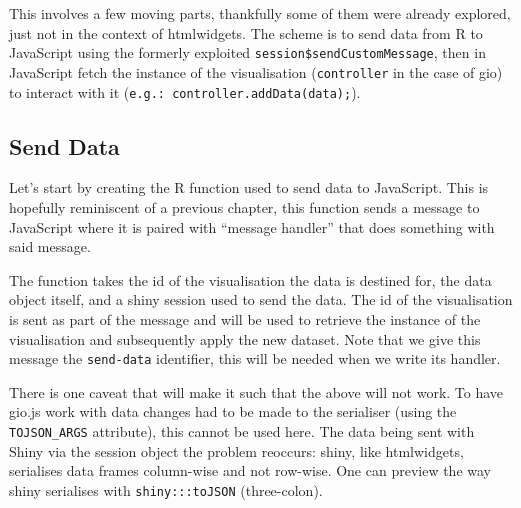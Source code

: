 \documentclass[
]{krantz}
\makeatletter
\newenvironment{Shaded}{\begin{snugshade}}{\end{snugshade}}
\newcommand{\CommentTok}[1]{\textcolor[rgb]{0.37,0.37,0.37}{\textit{#1}}}
\newcommand{\ControlFlowTok}[1]{\textcolor[rgb]{0.27,0.27,0.27}{\textbf{#1}}}
\newcommand{\DataTypeTok}[1]{\textcolor[rgb]{0.27,0.27,0.27}{#1}}
\newcommand{\KeywordTok}[1]{\textcolor[rgb]{0.27,0.27,0.27}{\textbf{#1}}}
\newcommand{\NormalTok}[1]{#1}
\newcommand{\OperatorTok}[1]{\textcolor[rgb]{0.43,0.43,0.43}{\textbf{#1}}}
\newcommand{\StringTok}[1]{\textcolor[rgb]{0.5,0.5,0.5}{#1}}
\newenvironment{kframe}{%
\medskip{}
\setlength{\fboxsep}{.8em}
 \def\at@end@of@kframe{}%
 \ifinner\ifhmode%
  \def\at@end@of@kframe{\end{minipage}}%
  \begin{minipage}{\columnwidth}%
 \fi\fi%
 \def\FrameCommand##1{\hskip\@totalleftmargin \hskip-\fboxsep
 \colorbox{shadecolor}{##1}\hskip-\fboxsep
     \hskip-\linewidth \hskip-\@totalleftmargin \hskip\columnwidth}%
 \MakeFramed {\advance\hsize-\width
   \@totalleftmargin\z@ \linewidth\hsize
   \@setminipage}}%
 {\par\unskip\endMakeFramed%
 \at@end@of@kframe}
\renewenvironment{Shaded}{\begin{kframe}}{\end{kframe}}
\makeatother
\begin{document}
This involves a few moving parts, thankfully some of them were already explored, just not in the context of htmlwidgets. The scheme is to send data from R to JavaScript using the formerly exploited \texttt{session\$sendCustomMessage}, then in JavaScript fetch the instance of the visualisation (\texttt{controller} in the case of gio) to interact with it (\texttt{e.g.:\ controller.addData(data);}).

\hypertarget{send-data}{%
\subsection*{Send Data}\label{send-data}}


Let's start by creating the R function used to send data to JavaScript. This is hopefully reminiscent of a previous chapter, this function sends a message to JavaScript where it is paired with ``message handler'' that does something with said message.

\begin{Shaded}
\end{Shaded}

The function takes the id of the visualisation the data is destined for, the data object itself, and a shiny session used to send the data. The id of the visualisation is sent as part of the message and will be used to retrieve the instance of the visualisation and subsequently apply the new dataset. Note that we give this message the \texttt{send-data} identifier, this will be needed when we write its handler.

There is one caveat that will make it such that the above will not work. To have gio.js work with data changes had to be made to the serialiser (using the \texttt{TOJSON\_ARGS} attribute), this cannot be used here. The data being sent with Shiny via the session object the problem reoccurs: shiny, like htmlwidgets, serialises data frames column-wise and not row-wise. One can preview the way shiny serialises with \texttt{shiny:::toJSON} (three-colon).
\end{document}
